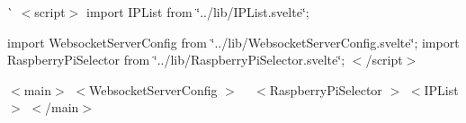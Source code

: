\`{} $<$script$>$ import IPList from \char`\"{}../lib/\+IPList.\+svelte\char`\"{};

import Websocket\+Server\+Config from \char`\"{}../lib/\+Websocket\+Server\+Config.\+svelte\char`\"{}; import Raspberry\+Pi\+Selector from \char`\"{}../lib/\+Raspberry\+Pi\+Selector.\+svelte\char`\"{}; $<$/script$>$

$<$main$>$   $<$\+Websocket\+Server\+Config $>$ 
 ~\newline
 $<$\+Raspberry\+Pi\+Selector $>$   $<$\+IPList $>$   $<$/main$>$ 